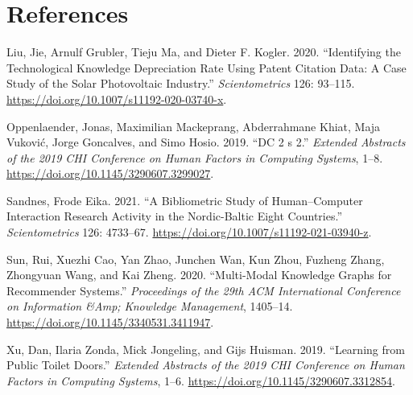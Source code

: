 \documentclass[
  12pt,
]{article}
\newlength{\cslhangindent}
\newenvironment{CSLReferences}[2] %
 {\begin{list}{}{%
  \setlength{\itemindent}{0pt}
  \setlength{\leftmargin}{0pt}
  \setlength{\parsep}{0pt}
  \ifodd #1
   \setlength{\leftmargin}{\cslhangindent}
   \setlength{\itemindent}{-1\cslhangindent}
  \fi
  \setlength{\itemsep}{#2\baselineskip}}}
 {\end{list}}
\begin{document}
\section*{References}\label{references}

\label{refs}
\begin{CSLReferences}{1}{0}
Liu, Jie, Arnulf Grubler, Tieju Ma, and Dieter F. Kogler. 2020.
{``Identifying the Technological Knowledge Depreciation Rate Using
Patent Citation Data: A Case Study of the Solar Photovoltaic
Industry.''} \emph{Scientometrics} 126: 93--115.
\url{https://doi.org/10.1007/s11192-020-03740-x}.

Oppenlaender, Jonas, Maximilian Mackeprang, Abderrahmane Khiat, Maja
Vuković, Jorge Goncalves, and Simo Hosio. 2019. {``DC 2 s 2.''}
\emph{Extended Abstracts of the 2019 CHI Conference on Human Factors in
Computing Systems}, 1--8. \url{https://doi.org/10.1145/3290607.3299027}.

Sandnes, Frode Eika. 2021. {``A Bibliometric Study of Human--Computer
Interaction Research Activity in the Nordic-Baltic Eight Countries.''}
\emph{Scientometrics} 126: 4733--67.
\url{https://doi.org/10.1007/s11192-021-03940-z}.

Sun, Rui, Xuezhi Cao, Yan Zhao, Junchen Wan, Kun Zhou, Fuzheng Zhang,
Zhongyuan Wang, and Kai Zheng. 2020. {``Multi-Modal Knowledge Graphs for
Recommender Systems.''} \emph{Proceedings of the 29th ACM International
Conference on Information \&Amp; Knowledge Management}, 1405--14.
\url{https://doi.org/10.1145/3340531.3411947}.

Xu, Dan, Ilaria Zonda, Mick Jongeling, and Gijs Huisman. 2019.
{``Learning from Public Toilet Doors.''} \emph{Extended Abstracts of the
2019 CHI Conference on Human Factors in Computing Systems}, 1--6.
\url{https://doi.org/10.1145/3290607.3312854}.

\end{CSLReferences}
\end{document}
